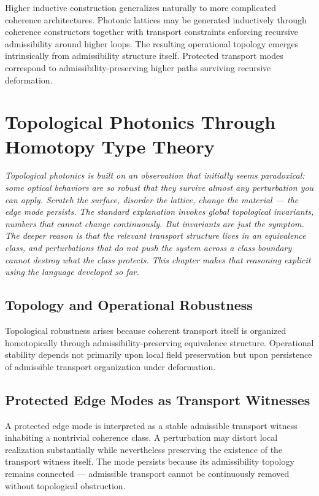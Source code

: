 \documentclass[11pt,openany]{book}
\theoremstyle{definition}
\theoremstyle{plain}
\begin{document}
Higher inductive construction generalizes naturally to more complicated coherence architectures. Photonic lattices may be generated inductively through coherence constructors together with transport constraints enforcing recursive admissibility around higher loops. The resulting operational topology emerges intrinsically from admissibility structure itself. Protected transport modes correspond to admissibility-preserving higher paths surviving recursive deformation.


\chapter{Topological Photonics Through Homotopy Type Theory}

\noindent\textit{Topological photonics is built on an observation that initially seems paradoxical: some optical behaviors are so robust that they survive almost any perturbation you can apply. Scratch the surface, disorder the lattice, change the material --- the edge mode persists. The standard explanation invokes global topological invariants, numbers that cannot change continuously. But invariants are just the symptom. The deeper reason is that the relevant transport structure lives in an equivalence class, and perturbations that do not push the system across a class boundary cannot destroy what the class protects. This chapter makes that reasoning explicit using the language developed so far.}

\bigskip

\section{Topology and Operational Robustness}

Topological robustness arises because coherent transport itself is organized homotopically through admissibility-preserving equivalence structure. Operational stability depends not primarily upon local field preservation but upon persistence of admissible transport organization under deformation.

\section{Protected Edge Modes as Transport Witnesses}

A protected edge mode is interpreted as a stable admissible transport witness inhabiting a nontrivial coherence class. A perturbation may distort local realization substantially while nevertheless preserving the existence of the transport witness itself. The mode persists because its admissibility topology remains connected --- admissible transport cannot be continuously removed without topological obstruction.
\end{document}
